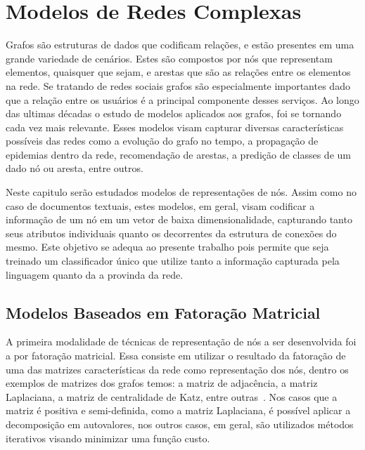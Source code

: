 \chapter{Modelos de Redes Complexas}
\label{chapter:networks}

Grafos são estruturas de dados que codificam relações, e estão presentes em uma
grande variedade de cenários.
Estes são compostos por nós que representam elementos, quaisquer que sejam, e
arestas que são as relações entre os elementos na rede.
Se tratando de redes sociais grafos são especialmente importantes dado que
a relação entre os usuários é a principal componente desses serviços.
Ao longo das ultimas décadas o estudo de modelos aplicados aos grafos, foi se
tornando cada vez mais relevante.
Esses modelos visam capturar diversas características possíveis das redes como a
evolução do grafo no tempo, a propagação de epidemias dentro da rede,
recomendação de arestas, a predição de classes de um dado nó ou aresta, entre outros.

Neste capitulo serão estudados modelos de representações de nós.
Assim como no caso de documentos textuais, estes modelos, em geral, visam
codificar a informação de um nó em um vetor de baixa dimensionalidade,
capturando tanto seus atributos individuais quanto os decorrentes da estrutura
de conexões do mesmo.
Este objetivo se adequa ao presente trabalho pois permite que seja treinado um
classificador único que utilize tanto a informação capturada pela linguagem quanto
da a provinda da rede.




\section{Modelos Baseados em Fatoração Matricial}

A primeira modalidade de técnicas de representação de nós a ser desenvolvida foi
a por fatoração matricial.
Essa consiste em utilizar o resultado da fatoração de uma das matrizes
características da rede como representação dos nós, dentro os exemplos de
matrizes dos grafos temos: a matriz de adjacência, a matriz Laplaciana, a matriz
de centralidade de Katz, entre outras~\cite{goyal18}.
Nos casos que a matriz é positiva e semi-definida, como a matriz Laplaciana, é
possível aplicar a decomposição em autovalores, nos outros casos, em geral, são
utilizados métodos iterativos visando minimizar uma função custo.

